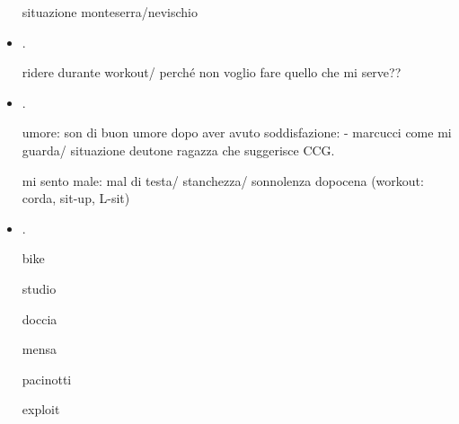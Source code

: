 \begin{itemize}
situazione monteserra/nevischio

\item {}.

ridere durante workout/ perch\'e non voglio fare quello che mi serve??

\item {}.


umore: son di buon umore dopo aver avuto soddisfazione:  - marcucci come mi guarda/ situazione deutone ragazza che suggerisce CCG.

mi sento male: mal di testa/ stanchezza/ sonnolenza dopocena (workout: corda, sit-up, L-sit) 

\item {}.
 
bike

studio

doccia

mensa

pacinotti

exploit


\end{itemize}
